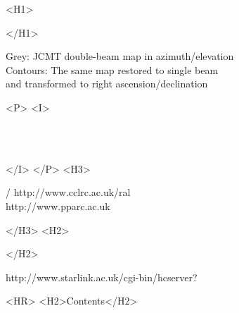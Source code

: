 \begin{htmlonly}
   \xlabel{}
   \begin{rawhtml} <H1> \end{rawhtml}
      \stardoctitle
   \begin{rawhtml} </H1> \end{rawhtml}

   \begin{figure}[h]
   \epsfysize=130mm
   \end{figure}

   Grey: JCMT double-beam map in azimuth/elevation\\
   Contours: The same map restored to single beam\\
   and transformed to right ascension/declination

   \begin{rawhtml} <P> <I> \end{rawhtml}
   \stardoccategory \stardocnumber \\
   \stardocauthors \\
   \stardocdate
   \begin{rawhtml} </I> </P> <H3> \end{rawhtml}
       /
                        {http://www.cclrc.ac.uk/ral} \\
                        {http://www.pparc.ac.uk} \\
   \begin{rawhtml} </H3> <H2> \end{rawhtml}
   \begin{rawhtml} </H2> \end{rawhtml}
      {http://www.starlink.ac.uk/cgi-bin/hcserver?\stardocsource}\\

  \label{stardoccontents}
  \begin{rawhtml}
    <HR>
    <H2>Contents</H2>
  \end{rawhtml}
  \renewcommand{\latexonlytoc}[0]{}


\end{htmlonly}
